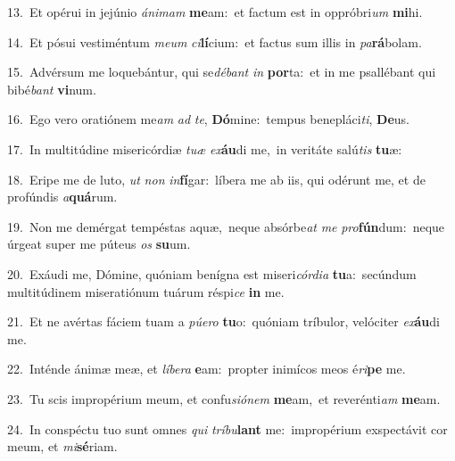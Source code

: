 {\numbfont\textcolor{\numbcolor}{13.}}~Et opérui in jejúnio \textit{á}\-\textit{ni}\textit{mam} \textbf{me}\-am:~\star et factum est in oppróbri\textit{um} \textbf{mi}\-hi.\par
{\numbfont\textcolor{\numbcolor}{14.}}~Et pósui vestiméntum \textit{me}\-\textit{um} \textit{ci}\-\textbf{lí}cium:~\star et factus sum illis in \textit{pa}\-\textbf{rá}bolam.\par
{\numbfont\textcolor{\numbcolor}{15.}}~Advérsum me loquebántur, qui se\-\textit{dé}\-\textit{bant} \textit{in} \textbf{por}\-ta:~\star et in me psallébant qui bibé\textit{bant} \textbf{vi}\-num.\par
{\numbfont\textcolor{\numbcolor}{16.}}~Ego vero oratiónem me\textit{am} \textit{ad} \textit{te}\-, \textbf{Dó}\-mine:~\star tempus benepláci\-\textit{ti}\-, \textbf{De}\-us.\par
{\numbfont\textcolor{\numbcolor}{17.}}~In multitúdine misericórdiæ \textit{tu}\-\textit{æ} \textit{ex}\-\textbf{áu}di me,~\star in veritáte salú\textit{tis} \textbf{tu}\-æ:\par
{\numbfont\textcolor{\numbcolor}{18.}}~Eripe me de luto, \textit{ut} \textit{non} \textit{in}\-\textbf{fí}gar:~\star líbera me ab iis, qui odérunt me, et de profúndis \textit{a}\-\textbf{quá}rum.\par
{\numbfont\textcolor{\numbcolor}{19.}}~Non me demérgat tempéstas aquæ,~\dagger neque absórbe\textit{at} \textit{me} \textit{pro}\-\textbf{fún}dum:~\star neque úrgeat super me púteus \textit{os} \textbf{su}\-um.\par
{\numbfont\textcolor{\numbcolor}{20.}}~Exáudi me, Dómine, quóniam benígna est miseri\-\textit{cór}\-\textit{di}\textit{a} \textbf{tu}\-a:~\star secúndum multitúdinem miseratiónum tuárum réspi\textit{ce} \textbf{in} me.\par
{\numbfont\textcolor{\numbcolor}{21.}}~Et ne avértas fáciem tuam a \textit{pú}\-\textit{e}\textit{ro} \textbf{tu}\-o:~\star quóniam tríbulor, velóciter \textit{ex}\-\textbf{áu}di me.\par
{\numbfont\textcolor{\numbcolor}{22.}}~Inténde ánimæ meæ, et \textit{lí}\-\textit{be}\textit{ra} \textbf{e}\-am:~\star propter inimícos meos é\-\textit{ri}\-\textbf{pe} me.\par
{\numbfont\textcolor{\numbcolor}{23.}}~Tu scis impropérium meum, et confu\-\textit{si}\-\textit{ó}\textit{nem} \textbf{me}\-am,~\star et reverénti\textit{am} \textbf{me}\-am.\par
{\numbfont\textcolor{\numbcolor}{24.}}~In conspéctu tuo sunt omnes \textit{qui} \textit{trí}\-\textit{bu}\textbf{lant} me:~\star impropérium exspectávit cor meum, et \textit{mi}\-\textbf{sé}riam.\par
